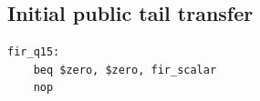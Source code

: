 \subsection{Initial public tail transfer}
\begin{verbatim}
fir_q15:
    beq $zero, $zero, fir_scalar
    nop
\end{verbatim}
